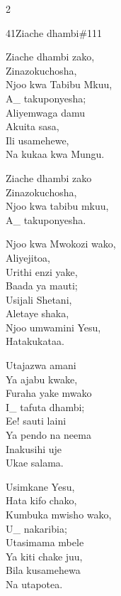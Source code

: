 \begin{multicols}{2}
\begin{hymn}{41}{Ziache dhambi}{\#111}
\begin{stanza}
Ziache dhambi zako,\\
Zinazokuchosha,\\
Njoo kwa Tabibu Mkuu,\\
A\_ takuponyesha;\\
Aliyemwaga damu\\
Akuita sasa,\\
Ili usamehewe,\\
Na kukaa kwa Mungu.
\end{stanza}
\begin{chorus}
Ziache dhambi zako\\
Zinazokuchosha,\\
Njoo kwa tabibu mkuu,\\
A\_ takuponyesha.
\end{chorus}
\begin{stanza}
Njoo kwa Mwokozi wako,\\
Aliyejitoa,\\
Urithi enzi yake,\\
Baada ya mauti;\\
Usijali Shetani,\\
Aletaye shaka,\\
Njoo umwamini Yesu,\\
Hatakukataa.
\end{stanza}
\begin{stanza}
Utajazwa amani\\
Ya ajabu kwake,\\
Furaha yake mwako\\
I\_ tafuta dhambi;\\
Ee! sauti laini\\
Ya pendo na neema\\
Inakusihi uje\\
Ukae salama.
\end{stanza}
\begin{stanza}
Usimkane Yesu,\\
Hata kifo chako,\\
Kumbuka mwisho wako,\\
U\_ nakaribia;\\
Utasimama mbele\\
Ya kiti chake juu,\\
Bila kusamehewa\\
Na utapotea.
\end{stanza}
\end{hymn}


\end{multicols}
